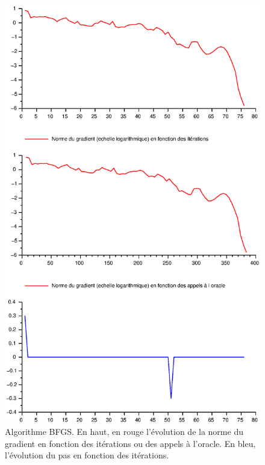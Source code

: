 \documentclass[11pt]{article}
\begin{document}
\begin{figure}[H]
  \centering
    \includegraphics[width=0.95 \textwidth]{Images/Lagrange_alg_BFGS.eps}
  \caption{Algorithme BFGS. En haut, en rouge l'évolution de la norme du gradient en fonction des itérations ou des appels à l'oracle. En bleu, l'évolution du pas en fonction des itérations.}
\end{figure}
\end{document}
